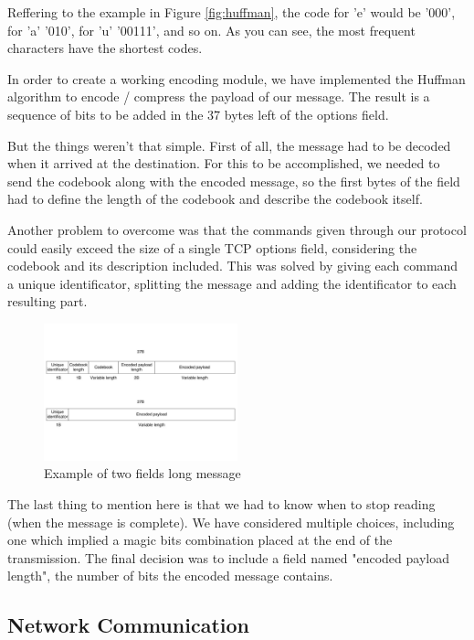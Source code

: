 Reffering to the example in Figure \ref{fig:huffman}, the code for 'e' would
be '000', for 'a' '010', for 'u' '00111', and so on. As you can see, the most
frequent characters have the shortest codes.

In order to create a working encoding module, we have implemented the Huffman
algorithm to encode / compress the payload of our message. The result is a
sequence of bits to be added in the 37 bytes left of the options field.

But the things weren't that simple. First of all, the message had to be decoded
when it arrived at the destination. For this to be accomplished, we needed to
send the codebook along with the encoded message, so the first bytes of the
field had to define the length of the codebook and describe the codebook itself.

Another problem to overcome was that the commands given through our protocol
could easily exceed the size of a single TCP options field, considering the
codebook and its description included. This was solved by giving each command
a unique identificator, splitting the message and adding the identificator to
each resulting part.

\begin{figure}
  \centering
  \includegraphics[width=0.5\textwidth]{img/encoded}
  \caption{Example of two fields long message}
  \label{fig:encoded}
\end{figure}

The last thing to mention here is that we had to know when to stop reading
(when the message is complete). We have considered multiple choices, including
one which implied a magic bits combination placed at the end of the transmission.
The final decision was to include a field named "encoded payload length", the
number of bits the encoded message contains.

\subsection{Network Communication}
\label{sec:net-comm}

